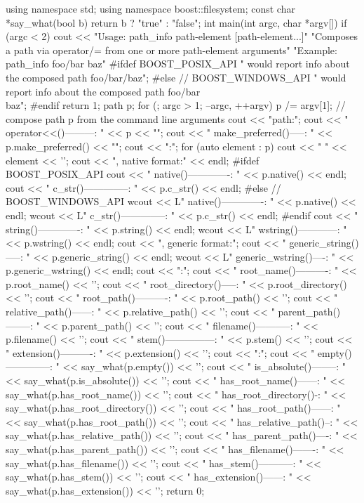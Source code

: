 \begin{codebox}[cpp]
using namespace std;
using namespace boost::filesystem;
const char *say_what(bool b) { return b ? "true" : "false"; }
int main(int argc, char *argv[])
{
  if (argc < 2)
  {
    cout
        << "Usage: path_info path-element [path-element...]\n"
           "Composes a path via operator/= from one or more path-element arguments\n"
           "Example: path_info foo/bar baz\n"
#ifdef BOOST_POSIX_API
           " would report info about the composed path foo/bar/baz\n";
#else // BOOST_WINDOWS_API
           " would report info about the composed path foo/bar\\baz\n";
#endif
    return 1;
  }
  path p;
  for (; argc > 1; --argc, ++argv)
    p /= argv[1]; // compose path p from the command line arguments
  cout << "\ncomposed path:\n";
  cout << " operator<<()---------: " << p << "\n";
  cout << " make_preferred()-----: " << p.make_preferred() << "\n";
  cout << "\nelements:\n";
  for (auto element : p)
    cout << " " << element << '\n';
  cout << "\nobservers, native format:" << endl;
#ifdef BOOST_POSIX_API
  cout << " native()-------------: " << p.native() << endl;
  cout << " c_str()--------------: " << p.c_str() << endl;
#else // BOOST_WINDOWS_API
  wcout << L" native()-------------: " << p.native() << endl;
  wcout << L" c_str()--------------: " << p.c_str() << endl;
#endif
  cout << " string()-------------: " << p.string() << endl;
  wcout << L" wstring()------------: " << p.wstring() << endl;
  cout << "\nobservers, generic format:\n";
  cout << " generic_string()-----: " << p.generic_string() << endl;
  wcout << L" generic_wstring()----: " << p.generic_wstring() << endl;
  cout << "\ndecomposition:\n";
  cout << " root_name()----------: " << p.root_name() << '\n';
  cout << " root_directory()-----: " << p.root_directory() << '\n';
  cout << " root_path()----------: " << p.root_path() << '\n';
  cout << " relative_path()------: " << p.relative_path() << '\n';
  cout << " parent_path()--------: " << p.parent_path() << '\n';
  cout << " filename()-----------: " << p.filename() << '\n';
  cout << " stem()---------------: " << p.stem() << '\n';
  cout << " extension()----------: " << p.extension() << '\n';
  cout << "\nquery:\n";
  cout << " empty()--------------: " << say_what(p.empty()) << '\n';
  cout << " is_absolute()--------: " << say_what(p.is_absolute()) << '\n';
  cout << " has_root_name()------: " << say_what(p.has_root_name()) << '\n';
  cout << " has_root_directory()-: " << say_what(p.has_root_directory()) << '\n';
  cout << " has_root_path()------: " << say_what(p.has_root_path()) << '\n';
  cout << " has_relative_path()--: " << say_what(p.has_relative_path()) << '\n';
  cout << " has_parent_path()----: " << say_what(p.has_parent_path()) << '\n';
  cout << " has_filename()-------: " << say_what(p.has_filename()) << '\n';
  cout << " has_stem()-----------: " << say_what(p.has_stem()) << '\n';
  cout << " has_extension()------: " << say_what(p.has_extension()) << '\n';
  return 0;
}
\end{codebox}

